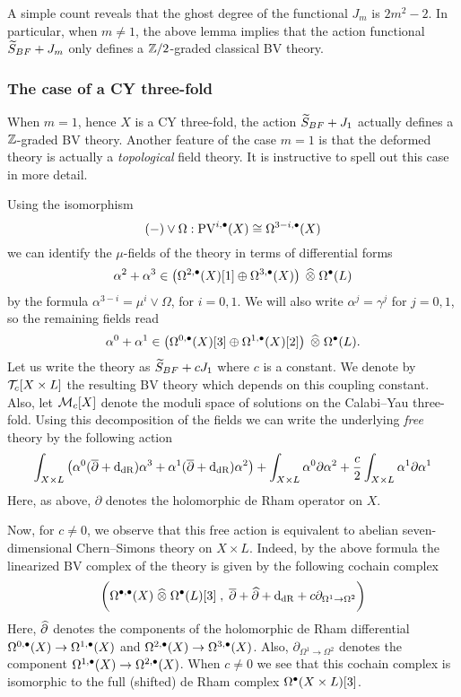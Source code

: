\documentclass[11pt]{amsart}
\def\PV{{\rm PV}}
\begin{document}
A simple count reveals that the ghost degree of the functional $J_m$ is $2m^2 - 2$.
In particular, when $m \ne 1$, the above lemma implies that the action functional $\Tilde{S}_{BF} + J_m$ only defines a $\ZZ/2$-graded classical BV theory.

\subsubsection{The case of a CY three-fold}

When $m=1$, hence $X$ is a CY three-fold, the action $\Tilde{S}_{BF} + J_1$ actually defines a $\ZZ$-graded BV theory.
Another feature of the case $m=1$ is that the deformed theory is actually a {\em topological} field theory.
It is instructive to spell out this case in more detail.

Using the isomorphism
\[
 (-) \vee \Omega : \PV^{i,\bu} (X) \cong \Omega^{3-i, \bu}(X)
\]
we can identify the $\mu$-fields of the theory in terms of differential forms
\[
  \alpha^2 + \alpha^3 \in \left(\Omega^{2,\bu}(X)[1] \oplus \Omega^{3,\bu}(X)\right) \; \Hat{\otimes} \; \Omega^\bu(L)
\]
by the formula $\alpha^{3-i} = \mu^{i} \vee \Omega$, for $i=0,1$.
We will also write $\alpha^{j} = \gamma^{j}$ for $j=0,1$, so the remaining fields read
\[
  \alpha^0 + \alpha^1 \in \left(\Omega^{0,\bu}(X)[3] \oplus \Omega^{1,\bu}(X)[2] \right) \; \Hat{\otimes} \; \Omega^\bu (L).
\]
Let us write the theory as $\Tilde{S}_{BF} + c J_1$ where $c$ is a constant.
We denote by $\cT_c [X \times L]$ the resulting BV theory which depends on this coupling constant.
Also, let $\cM_c[X]$ denote the moduli space of solutions on the Calabi--Yau three-fold.
Using this decomposition of the fields we can write the underlying {\em free} theory by the following action
\[
  \int_{X\times L} \left(\alpha^0 (\dbar + \d_{\rm dR}) \alpha^3 + \alpha^1 (\dbar + \d_{\rm dR}) \alpha^2 \right) + \int_{X \times L} \alpha^0 \partial \alpha^2 + \frac{c}{2} \int_{X \times L} \alpha^1 \partial \alpha^1
\]
Here, as above, $\partial$ denotes the holomorphic de Rham operator on $X$.

Now, for $c \ne 0$, we observe that this free action is equivalent to abelian seven-dimensional Chern--Simons theory on $X \times L$.
Indeed, by the above formula the linearized BV complex of the theory is given by the following cochain complex
\[
  \bigg(\Omega^{\bu, \bu} (X) \; \Hat{\otimes} \; \Omega^{\bu}(L) [3] \; , \; \dbar + \Hat{\partial} + \d_{\rm dR} + c \partial_{\Omega^{1} \to \Omega^{2}} \bigg)
\]
Here, $\Hat{\partial}$ denotes the components of the holomorphic de Rham differential $\Omega^{0,\bu}(X) \to \Omega^{1,\bu}(X)$ and $\Omega^{2,\bu}(X) \to \Omega^{3,\bu}(X)$.
Also, $\partial_{\Omega^1 \to \Omega^2}$ denotes the component $\Omega^{1,\bu}(X) \to \Omega^{2,\bu}(X)$.
When $c \ne 0$ we see that this cochain complex is isomorphic to the full (shifted) de Rham complex $\Omega^\bu(X \times L)[3]$.
\end{document}
